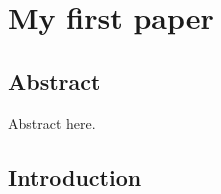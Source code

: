 \chapter{My first paper}
\clearpage

\section*{Abstract}
Abstract here.

\cleardoublepage

\section{Introduction}
\lipsum